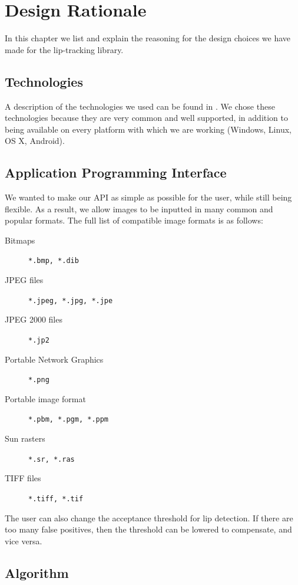\chapter{Design Rationale}

In this chapter we list and explain the reasoning for the design choices we have made for the lip-tracking library.

\section{Technologies}

A description of the technologies we used can be found in . We chose these technologies because they are very common and well supported, in addition to being available on every platform with which we are working (Windows, Linux, OS X, Android). 

\section{Application Programming Interface}

We wanted to make our API as simple as possible for the user, while still being flexible. As a result, we allow images to be inputted in many common and popular formats. The full list of compatible image formats is as follows:

\begin{description}
  \item[Bitmaps] \texttt{*.bmp, *.dib}
  \item[JPEG files] \texttt{*.jpeg, *.jpg, *.jpe}
  \item[JPEG 2000 files] \texttt{*.jp2}
  \item[Portable Network Graphics] \texttt{*.png}
  \item[Portable image format] \texttt{*.pbm, *.pgm, *.ppm}
  \item[Sun rasters] \texttt{*.sr, *.ras}
  \item[TIFF files] \texttt{*.tiff, *.tif}
\end{description}

The user can also change the acceptance threshold for lip detection. If there are too many false positives, then the threshold can be lowered to compensate, and vice versa.

\section{Algorithm}

